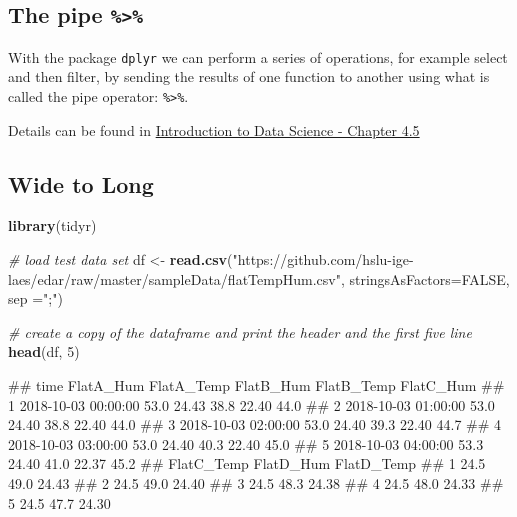 \documentclass[
  a4paperpaper,
]{book}
\newenvironment{Shaded}{\begin{snugshade}}{\end{snugshade}}
\newcommand{\CommentTok}[1]{\textcolor[rgb]{0.56,0.35,0.01}{\textit{#1}}}
\newcommand{\DataTypeTok}[1]{\textcolor[rgb]{0.13,0.29,0.53}{#1}}
\newcommand{\DecValTok}[1]{\textcolor[rgb]{0.00,0.00,0.81}{#1}}
\newcommand{\KeywordTok}[1]{\textcolor[rgb]{0.13,0.29,0.53}{\textbf{#1}}}
\newcommand{\NormalTok}[1]{#1}
\newcommand{\OtherTok}[1]{\textcolor[rgb]{0.56,0.35,0.01}{#1}}
\newcommand{\StringTok}[1]{\textcolor[rgb]{0.31,0.60,0.02}{#1}}
\let\oldShaded\Shaded
\let\endoldShaded\endShaded
\renewenvironment{Shaded}{\footnotesize\oldShaded}{\endoldShaded}
\let\oldverbatim\verbatim
\let\endoldverbatim\endverbatim
\renewenvironment{verbatim}{\footnotesize\oldverbatim}{\endoldverbatim}
\begin{document}
\hypertarget{the-pipe}{%
\subsection{\texorpdfstring{The pipe \texttt{\%\textgreater{}\%}}{The pipe \%\textgreater\%}}\label{the-pipe}}

With the package \texttt{dplyr} we can perform a series of operations, for example select and then filter, by sending the results of one function to another using what is called the pipe operator: \texttt{\%\textgreater{}\%}.

Details can be found in \href{https://rafalab.github.io/dsbook/tidyverse.html}{Introduction to Data Science - Chapter 4.5}

\newpage

\hypertarget{wide-to-long}{%
\subsection{Wide to Long}\label{wide-to-long}}

\begin{Shaded}
\begin{Highlighting}[]
\KeywordTok{library}\NormalTok{(tidyr)}

\CommentTok{# load test data set}
\NormalTok{df <-}\StringTok{ }\KeywordTok{read.csv}\NormalTok{(}\StringTok{"https://github.com/hslu-ige-laes/edar/raw/master/sampleData/flatTempHum.csv"}\NormalTok{,}
               \DataTypeTok{stringsAsFactors=}\OtherTok{FALSE}\NormalTok{,}
               \DataTypeTok{sep =}\StringTok{";"}\NormalTok{)}

\CommentTok{# create a copy of the dataframe and print the header and the first five line}
\KeywordTok{head}\NormalTok{(df, }\DecValTok{5}\NormalTok{)}
\end{Highlighting}
\end{Shaded}

\begin{verbatim}
##                  time FlatA_Hum FlatA_Temp FlatB_Hum FlatB_Temp FlatC_Hum
## 1 2018-10-03 00:00:00      53.0      24.43      38.8      22.40      44.0
## 2 2018-10-03 01:00:00      53.0      24.40      38.8      22.40      44.0
## 3 2018-10-03 02:00:00      53.0      24.40      39.3      22.40      44.7
## 4 2018-10-03 03:00:00      53.0      24.40      40.3      22.40      45.0
## 5 2018-10-03 04:00:00      53.3      24.40      41.0      22.37      45.2
##   FlatC_Temp FlatD_Hum FlatD_Temp
## 1       24.5      49.0      24.43
## 2       24.5      49.0      24.40
## 3       24.5      48.3      24.38
## 4       24.5      48.0      24.33
## 5       24.5      47.7      24.30
\end{verbatim}
\end{document}
